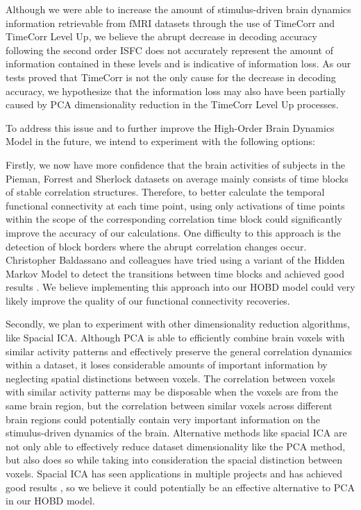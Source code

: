\documentclass[11pt]{article}
\begin{document}
Although we were able to increase the amount of stimulus-driven brain dynamics information retrievable from fMRI datasets through the use of TimeCorr and TimeCorr Level Up, we believe the abrupt decrease in decoding accuracy following the second order ISFC does not accurately represent the amount of information contained in these levels and is indicative of information loss. As our tests proved that TimeCorr is not the only cause for the decrease in decoding accuracy, we hypothesize that the information loss may also have been partially caused by PCA dimensionality reduction in the TimeCorr Level Up processes.

To address this issue and to further improve the High-Order Brain Dynamics Model in the future, we intend to experiment with the following options:

Firstly, we now have more confidence that the brain activities of subjects in the Pieman, Forrest and Sherlock datasets on average mainly consists of time blocks of stable correlation structures. Therefore, to better calculate the temporal functional connectivity at each time point, using only activations of time points within the scope of the corresponding correlation time block could significantly improve the accuracy of our calculations. One difficulty to this approach is the detection of block borders where the abrupt correlation changes occur. Christopher Baldassano and colleagues have tried using a variant of the Hidden Markov Model to detect the transitions between time blocks and achieved good results \citep{Baldassano2016}. We believe implementing this approach into our HOBD model could very likely improve the quality of our functional connectivity recoveries.

Secondly, we plan to experiment with other dimensionality reduction algorithms, like Spacial ICA. Although PCA is able to efficiently combine brain voxels with similar activity patterns and effectively preserve the general correlation dynamics within a dataset, it loses considerable amounts of important information by neglecting spatial distinctions between voxels. The correlation between voxels with similar activity patterns may be disposable when the voxels are from the same brain region, but the correlation between similar voxels across different brain regions could potentially contain very important information on the stimulus-driven dynamics of the brain. Alternative methods like spacial ICA are not only able to effectively reduce dataset dimensionality like the PCA method, but also does so while taking into consideration the spacial distinction between voxels. Spacial ICA has seen applications in multiple projects and has achieved good results \citep{Dipasquale2015}\citep{Iraji2016}\citep{Xu2013}, so we believe it could potentially be an effective alternative to PCA in our HOBD model.
\end{document}
